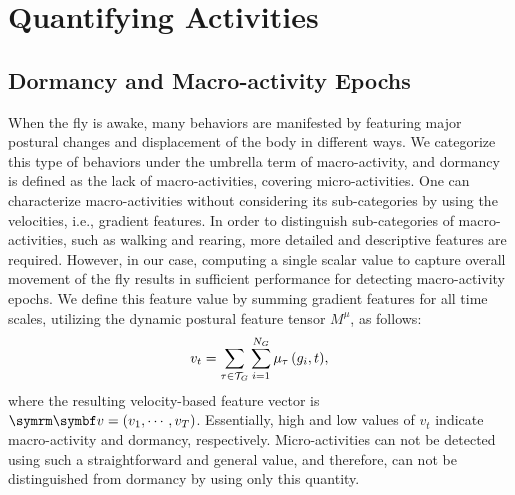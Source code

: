 
\section{Quantifying Activities}
\subsection{Dormancy and Macro-activity Epochs}
When the fly is awake, many behaviors are manifested by featuring major postural changes and displacement of the body in different ways.
We categorize this type of behaviors under the umbrella term of macro-activity, and dormancy is defined as the lack of macro-activities, covering micro-activities.
One can characterize macro-activities without considering its sub-categories by using the velocities, i.e., gradient features.
In order to distinguish sub-categories of macro-activities, such as walking and rearing, more detailed and descriptive features are required.
However, in our case, computing a single scalar value to capture overall movement of the fly results in sufficient performance for detecting macro-activity epochs. We define this feature value by summing gradient features for all time scales, utilizing the dynamic postural feature tensor $M^\mu$, as follows:
\begin{equation}\label{equation:displacement}
	v_t = \sum_{\tau \in \mathcal{T}_G}{\sum_{i=1}^{N_G}{\mu_\tau\left(g_i,t\right)}},
\end{equation}
where the resulting velocity-based feature vector is $\V{v}=\rbr{v_1, \cdots, v_T}$. Essentially, high and low values of $v_t$ indicate macro-activity and dormancy, respectively. Micro-activities can not be detected using such a straightforward and general value, and therefore, can not be distinguished from dormancy by using only this quantity.

